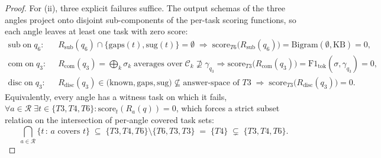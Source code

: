 \documentclass{article}
\begin{document}
\begin{proof}
For (ii), three explicit failures suffice. The output schemas of the three angles project onto disjoint sub-components of the per-task scoring functions, so each angle leaves at least one task with zero score:
\begin{equation}
\begin{aligned}
\mathrm{sub}\;\text{on}\;q_6\!:\;\;& R_{\mathrm{sub}}(q_6)\!\cap\!\bigl\{\mathrm{gaps}(t),\mathrm{sug}(t)\bigr\}\!=\!\emptyset
\;\Longrightarrow\; \mathrm{score}_{T6}\!\bigl(R_{\mathrm{sub}}(q_6)\bigr)\!=\!\mathrm{Bigram}(\emptyset,\mathrm{KB})\!=\!0,\\[2pt]
\mathrm{com}\;\text{on}\;q_3\!:\;\;& R_{\mathrm{com}}(q_3)\!=\!\bigoplus_{k}\sigma_k\;\text{averages over}\;\mathcal{C}_k\!\not\supseteq\!\gamma_{q_3}
\!\Longrightarrow \mathrm{score}_{T3}\!\bigl(R_{\mathrm{com}}(q_3)\bigr)\!=\!\mathrm{F1}_{\mathrm{tok}}(\sigma,\gamma_{q_3})\!=\!0,\\[2pt]
\mathrm{disc}\;\text{on}\;q_3\!:\;\;& R_{\mathrm{disc}}(q_3)\!\in\!\bigl(\mathrm{known},\mathrm{gaps},\mathrm{sug}\bigr)\!\not\subseteq\!\text{answer-space of }T3
\;\Longrightarrow\; \mathrm{score}_{T3}\!\bigl(R_{\mathrm{disc}}(q_3)\bigr)\!=\!0.
\end{aligned}
\label{eq:p3-fails}
\end{equation}
Equivalently, every angle has a witness task on which it fails, $\forall a\!\in\!\mathcal{R}\;\exists t\!\in\!\{T3,T4,T6\}\!:\!\mathrm{score}_t(R_a(q))\!=\!0$, which forces a strict subset relation on the intersection of per-angle covered task sets:
\begin{equation}
\bigcap_{a\in\mathcal{R}}\bigl\{t\,:\,a\text{ covers }t\bigr\}\;\subseteq\;\{T3,T4,T6\}\!\setminus\!\bigl\{T6,T3,T3\bigr\}\;=\;\{T4\}\;\subsetneq\;\{T3,T4,T6\}.
\label{eq:p3-no-single}
\end{equation}


\end{proof}
\end{document}
